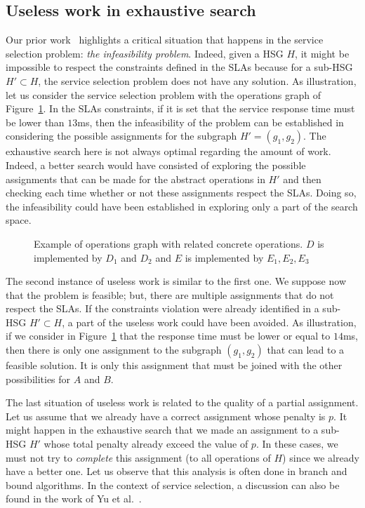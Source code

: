 \documentclass[a4paper]{article}
\begin{document}
\subsection{Useless work in exhaustive search}

Our prior work~\cite{JISA} highlights a critical situation that happens in the service selection 
problem: {\it the infeasibility problem}. Indeed, given a HSG $H$, it might be impossible to respect the 
constraints defined in the SLAs  because for a sub-HSG $H' \subset H$, the service selection 
problem does not have any solution. As illustration, let us consider the service selection problem with the 
operations graph of Figure~\ref{noSolution}. In the SLAs constraints, if it is set that the service response time must 
be lower than $13$ms, then the infeasibility of the problem can be established in considering the 
possible assignments for the subgraph $H' = (g_1, g_2)$. 
The exhaustive search here is not always optimal regarding the amount of work. Indeed,  
a better search would have consisted of exploring the possible assignments that can be made for the 
abstract operations in $H'$ and then checking each time whether or not these assignments respect the SLAs.  
Doing so, the infeasibility  could have been established in exploring only a part of the 
search space. 

\begin{figure}[htbp]
\centering
{}
\caption{Example of operations graph with related concrete operations. 
$D$ is implemented by $D_1$ and $D_2$ and $E$ is implemented by $E_1, E_2, E_3$}\label{noSolution}
\end{figure}


The second instance of useless work  is similar to the first one. We suppose 
now that the problem is feasible; but, there are multiple assignments that do not respect the 
SLAs. If the constraints violation were already identified in a sub-HSG $H' \subset H$, a part of the 
useless work could have been avoided. As illustration, if we consider in 
Figure~\ref{noSolution} that the response time must be lower or equal to $14$ms, then there is 
only one assignment to the subgraph $(g_1, g_2)$ that can lead to a feasible solution. 
It is only this assignment that must be joined with the other possibilities for $A$ and $B$.

The last situation of useless work is related to the quality of a partial assignment. 
Let us assume that we already have a correct assignment whose penalty is $p$. It might happen in the 
exhaustive search that we made an assignment to a sub-HSG $H'$ whose total penalty already exceed the value of $p$. 
In these cases, we must not try to {\it complete} this assignment (to all operations of $H$) since we already have a 
better one. Let us observe that this analysis is often done in branch and bound algorithms. In the 
context of service selection, a discussion can also be found in the work of Yu et al.~\cite{Yu}.
\end{document}
